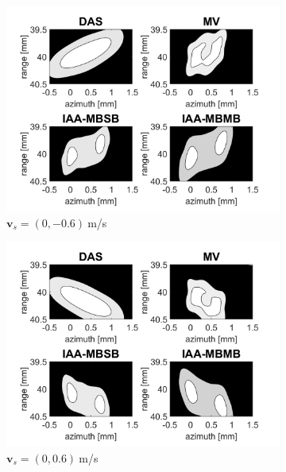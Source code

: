 \begin{figure}[ht]
\begin{subfigure}[t]{0.48\linewidth}
        \includegraphics[width=\linewidth]{./images/results/2.2/motion_90_-06.png}
        \caption{$\boldsymbol{v}_s = (0, -0.6)~$m/s}
    \end{subfigure}
    \quad
    \begin{subfigure}[t]{0.48\linewidth}
        \includegraphics[width=\linewidth]{./images/results/2.2/motion_90_06.png}
        \caption{$\boldsymbol{v}_s = (0, 0.6)~$m/s}
    \end{subfigure}
    \quad
    \begin{subfigure}[t]{0.48\linewidth}

\end{subfigure}
\end{figure}
